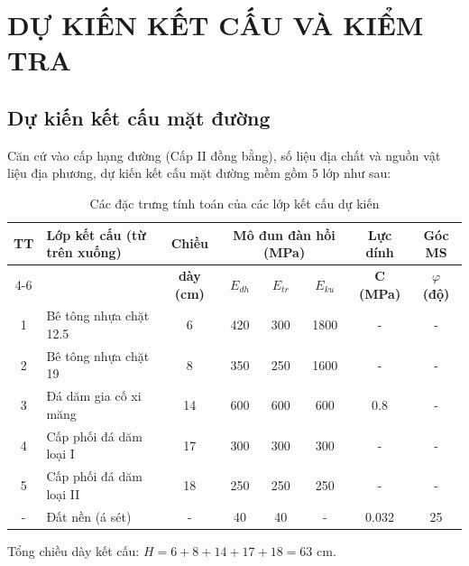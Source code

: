 \section{DỰ KIẾN KẾT CẤU VÀ KIỂM TRA}

\subsection{Dự kiến kết cấu mặt đường}
Căn cứ vào cấp hạng đường (Cấp II đồng bằng), số liệu địa chất và nguồn vật liệu địa phương, dự kiến kết cấu mặt đường mềm gồm 5 lớp như sau:

\begin{table}[H]
\centering
\caption{Các đặc trưng tính toán của các lớp kết cấu dự kiến}
\begin{tabular}{|c|l|c|c|c|c|c|c|}
\hline
\multirow{2}{*}{\textbf{TT}} & \multirow{2}{*}{\textbf{Lớp kết cấu (từ trên xuống)}} & \textbf{Chiều} & \multicolumn{3}{c|}{\textbf{Mô đun đàn hồi (MPa)}} & \textbf{Lực dính} & \textbf{Góc MS} \\
\cline{4-6}
& & \textbf{dày (cm)} & \textbf{$E_{dh}$} & \textbf{$E_{tr}$} & \textbf{$E_{ku}$} & \textbf{C (MPa)} & \textbf{$\varphi$ (độ)} \\
\hline
1 & Bê tông nhựa chặt 12.5 & 6 & 420 & 300 & 1800 & - & - \\
\hline
2 & Bê tông nhựa chặt 19 & 8 & 350 & 250 & 1600 & - & - \\
\hline
3 & Đá dăm gia cố xi măng & 14 & 600 & 600 & 600 & 0.8 & - \\
\hline
4 & Cấp phối đá dăm loại I & 17 & 300 & 300 & 300 & - & - \\
\hline
5 & Cấp phối đá dăm loại II & 18 & 250 & 250 & 250 & - & - \\
\hline
- & Đất nền (á sét) & - & 40 & 40 & - & 0.032 & 25 \\
\hline
\end{tabular}
\end{table}

Tổng chiều dày kết cấu: $H = 6 + 8 + 14 + 17 + 18 = 63$ cm.

